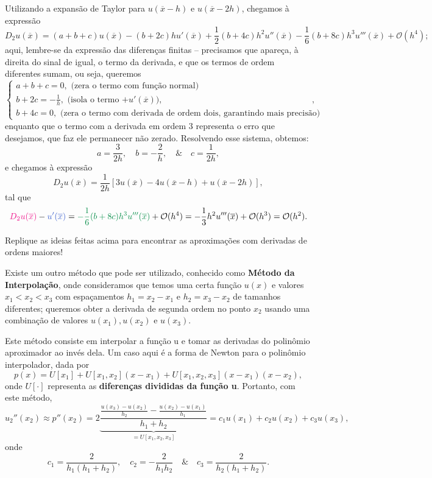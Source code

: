 \documentclass[../differential_methods.tex]{subfiles}
\begin{document}
Utilizando a expansão de Taylor para \(u(\overline{x}-h)\) e \(u(\overline{x}-2h)\), chegamos à expressão
\[
	D_{2}u(\overline{x})=(a+b+c)u(\overline{x})-(b+2c)hu'(\overline{x})+\frac{1}{2}(b+4c)h^{2}u''(\overline{x})-\frac{1}{6}(b+8c)h^{3}u'''(\overline{x})+\mathcal{O}(h^{4});
\]
aqui, lembre-se da expressão das diferenças finitas -- precisamos que apareça, à direita do sinal de igual, o termo da derivada, e que os termos de ordem diferentes sumam, ou seja, queremos
\[
	\left\{\begin{array}{ll}
		a+b+c = 0, \text{ (zera o termo com função normal)}                 \\
		b+2c = -\frac{1}{h}, \text{ (isola o termo \(+u'(\overline{x})\))}, \\
		b+4c = 0, \text{ (zera o termo com derivada de ordem dois, garantindo mais precisão)}
	\end{array}\right.,
\]
enquanto que o termo com a derivada em ordem 3 representa o erro que desejamos, que faz ele permanecer não zerado.
Resolvendo esse sistema, obtemos:
\[
	a = \frac{3}{2h},\quad b = - \frac{2}{h},\quad\&\quad c = \frac{1}{2h},
\]
e chegamos à expressão
\[
	D_{2}u(\overline{x})=\frac{1}{2h}[3u(\overline{x})-4u(\overline{x}-h)+u(\overline{x}-2h)],
\]
tal que
\[
	{\color{DeepPink2}D_{2}u(\overline{x})}-{\color{RoyalBlue3}u'(\overline{x})} = {\color{SpringGreen4}-\frac{1}{6}(b+8c)h^{3}u'''(\overline{x})}+\mathcal{O}(h^{4})=-\frac{1}{3}h^{2}u'''(\overline{x})+\mathcal{O}(h^{3}) = \mathcal{O}(h^{2}).
\]

\begin{exr}
	Replique as ideias feitas acima para encontrar as aproximações com derivadas de ordens maiores!
\end{exr}

Existe um outro método que pode ser utilizado, conhecido como \textbf{Método da Interpolação}, onde consideramos que temos uma certa função \(u(x)\) e valores \(x_1 < x_2 < x_3\) com espaçamentos \(h_1 = x_2-x_1\) e \(h_2 = x_3-x_2\) de tamanhos diferentes; queremos obter a derivada de segunda ordem no ponto \(x_2\) usando uma combinação de valores \(u(x_1), u(x_2)\) e \(u(x_3)\).

Este método consiste em interpolar a função u e tomar as derivadas do polinômio aproximador ao invés dela. Um caso aqui é a forma de Newton para o polinômio interpolador, dada por
\[
	p(x)=U[x_1] + U[x_1, x_2] (x-x_1) + U[x_1, x_2, x_3](x-x_1)(x-x_2),
\]
onde \(U[\cdot ]\) representa as \textbf{diferenças divididas da função u}. Portanto, com este método,
\[
	u_{2}''(x_2)\approx p''(x_2) = 2 \underbrace{\frac{\frac{u(x_3)-u(x_2)}{h_2} - \frac{u(x_2)-u(x_1)}{h_1}}{h_1+h_2}}_{=U[x_1, x_2, x_3]} = c_1u(x_1)+c_2u(x_2)+c_3u(x_3),
\]
onde
\[
	c_1 = \frac{2}{h_1 (h_1+h_2)}, \quad c_2=-\frac{2}{h_1h_2} \quad\&\quad c_{3}=\frac{2}{h_2(h_1+h_2)}.
\]
\end{document}

